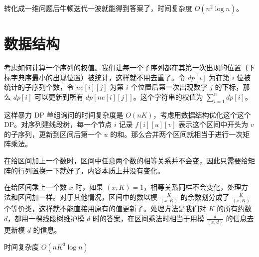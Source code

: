 \documentclass[11pt, a4paper]{article}
\begin{document}
转化成一维问题后牛顿迭代一波就能得到答案了，时间复杂度 $O(n^2 \log n)$。
\section{数据结构}

考虑如何计算一个序列的权值。我们让每一个子序列都在其第一次出现的位置（下标字典序最小的出现位置）被统计，这样就不用去重了。令 $dp[i]$ 为在第 $i$ 位被统计的子序列个数，令 $ne[i][j]$ 为第 $i$ 个位置后第一次出现数字 $j$ 的下标，那么 $dp[i]$ 可以更新到所有 $dp[ne[i][j]]$。这个字符串的权值为 $\sum_{i=1}^n dp[i]$。

这样暴力 DP 单组询问的时间复杂度是 $O(nK)$，考虑用数据结构优化这个这个 DP。对序列建线段树，每一个节点 $i$ 记录 $f[i][u][v]$ 表示这个区间中开头为 $v$ 的子序列，更新到区间后第一个 $u$ 的和。那么合并两个区间就相当于进行一次矩阵乘法。

在给区间加上一个数时，区间中任意两个数的相等关系并不会变，因此只需要给矩阵的行列置换一下就好了，内容本质上并没有变化。

在给区间乘上一个数 $x$ 时，如果 $(x,K)=1$，相等关系同样不会变化，处理方法和区间加一样。对于其他情况，区间中的数以模 $\frac{K}{(x,K)}$ 的余数划分成了 $\frac{K}{(x,K)}$ 个等价类，这样就不能直接用原有的值更新了。处理方法是我们对 $K$ 的所有约数 $d$，都用一棵线段树维护模 $d$ 时的答案，在区间乘法时相当于用模 $\frac{d}{(x,d)}$ 的信息去更新模 $d$ 的信息。

时间复杂度 $O(nK^3\log n)$
\end{document}
